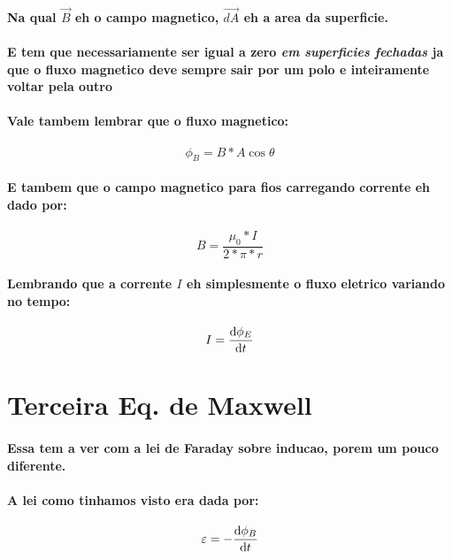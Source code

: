 \documentclass[12pt,twoside, a4paper, twocolumn]{article}
\begin{document}
\paragraph*{Na qual $\vec{B}$ eh o campo magnetico, $\vec{dA}$ eh a area da superficie.}
\paragraph*{E tem que necessariamente ser igual a zero \emph{em superficies fechadas} ja que o fluxo magnetico deve sempre sair por um polo e inteiramente voltar pela outro}

\paragraph*{Vale tambem lembrar que o fluxo magnetico:}
\begin{equation}
    \phi_B = B  *  A \cos{\theta}
\end{equation}
\paragraph*{E tambem que o campo magnetico para fios carregando corrente eh dado por:}
\begin{equation}
    B = \frac{\mu_0 * I}{2 * \pi * r}
\end{equation}
\paragraph*{Lembrando que a corrente $I$ eh simplesmente o fluxo eletrico variando no tempo:}
\begin{equation}
    I = \frac{\mathrm d \phi_E}{\mathrm d t}
\end{equation}


\section{Terceira Eq. de Maxwell}
\paragraph*{Essa tem a ver com a lei de Faraday sobre inducao, porem um pouco diferente.}
\paragraph*{A lei como tinhamos visto era dada por:}
\begin{equation}
    \varepsilon = - \frac{\mathrm d \phi_B}{\mathrm d t}
\end{equation}
\end{document}
